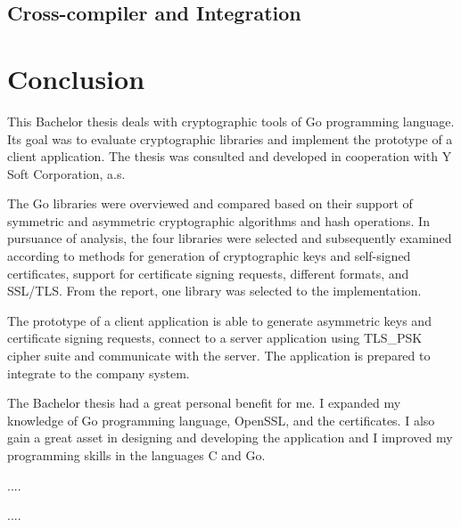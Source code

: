\documentclass[
  digital, %
  notable,   %
  lof,     %
  lot,     %
]{fithesis3}
\begin{document}
\section{Cross-compiler and Integration}




\chapter{Conclusion}
This Bachelor thesis deals with cryptographic tools of Go programming language. Its goal was to evaluate cryptographic libraries and implement the prototype of a client application. The thesis was consulted and developed in cooperation with Y Soft Corporation, a.s.

The Go libraries were overviewed and compared based on their support of symmetric and asymmetric cryptographic algorithms and hash operations. In pursuance of analysis, the four libraries were selected and subsequently examined according to methods for generation of cryptographic keys and self-signed certificates, support for certificate signing requests, different formats, and SSL/TLS.  From the report, one library was selected to the implementation.

The prototype of a client application is able to generate asymmetric keys and certificate signing requests, connect to a server application using TLS\_PSK cipher suite and communicate with the server. The application is prepared to integrate to the company system.

The Bachelor thesis had a great personal benefit for me. I expanded my knowledge of Go programming language, OpenSSL, and the certificates. I also gain a great asset in designing and developing the application and I improved my programming skills in the languages C and Go. 

....

....

\printbibliography
\end{document}
